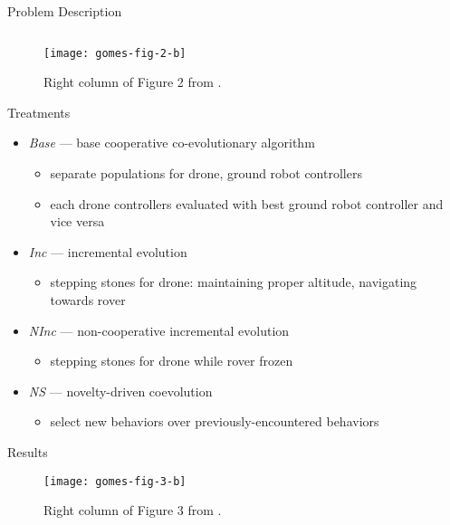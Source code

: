 \begin{frame}{Problem Description}

\begin{figure}
\begin{columns}
\begin{column}{0.5\textwidth}
\texttt{[image: gomes-fig-2-b]}
\end{column}
\begin{column}{0.5\textwidth}
\caption{
Right column of Figure 2 from \cite{gomes2015cooperative}.
}
\end{column}
\end{columns}
\end{figure}

\end{frame}

\begin{frame}{Treatments}

\Large
\begin{itemize}
\item \textit{Base} ---  base cooperative co-evolutionary algorithm
\begin{itemize}
\item separate populations for drone, ground robot controllers
\item each drone controllers evaluated with best ground robot controller and vice versa
\end{itemize}
\item \textit{Inc} --- incremental evolution
\begin{itemize}
\item stepping stones for drone: maintaining proper altitude, navigating towards rover
\end{itemize}
\item \textit{NInc} --- non-cooperative incremental evolution
\begin{itemize}
\item stepping stones for drone while rover frozen
\end{itemize}
\item \textit{NS} --- novelty-driven coevolution
\begin{itemize}
\item select new behaviors over previously-encountered behaviors
\end{itemize}
\end{itemize}
\end{frame}

\begin{frame}{Results}

\begin{figure}

\texttt{[image: gomes-fig-3-b]}

\caption{
Right column of Figure 3 from \cite{gomes2015cooperative}.
}

\end{figure}

\end{frame}

